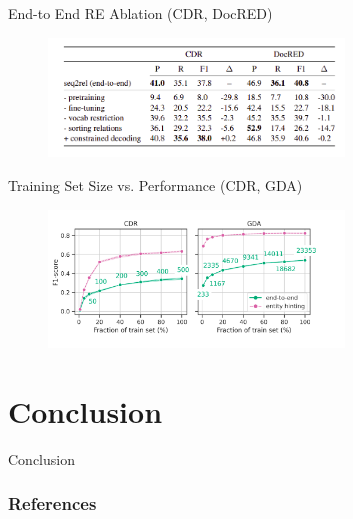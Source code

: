 \documentclass[usenames,dvipsnames,pdf]{beamer}
\begin{document}
        \begin{frame}{End-to End RE Ablation (CDR, DocRED)}
          \begin{figure}
            \includegraphics[width=0.7\textwidth,height=0.7\textheight,keepaspectratio]{ablation} 
          \end{figure}
        \end{frame}

        \begin{frame}{Training Set Size vs. Performance (CDR, GDA)}
          \begin{figure}
            \includegraphics[width=0.7\textwidth,height=0.7\textheight,keepaspectratio]{training_set_size_plateau} 
          \end{figure}
        \end{frame}
        
        \section{Conclusion}

        \begin{frame}{Conclusion}
        \end{frame}

        \begin{frame}[allowframebreaks]
          \frametitle{References}
          
          
        \end{frame}
      
\end{document}
